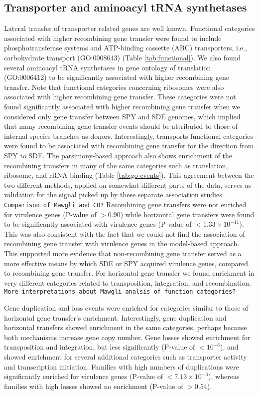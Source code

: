 \documentclass[english]{article}
\begin{document}
\subsection{Transporter and aminoacyl tRNA synthetases}
Lateral transfer of transporter related genes are well known.  Functional
categories associated with higher recombining gene transfer were found to
include phosphotransferase systems and ATP-binding cassette (ABC) transporters,
i.e., carbohydrate transport (GO:0008643) (Table \ref{tab:functional}).  We also
found several aminoacyl tRNA synthetases in gene ontology of translation
(GO:0006412) to be significantly associated with higher recombining gene
transfer.  Note that functional categories concerning ribosomes were also
associated with higher recombining gene transfer. These categories were not
found significantly associated with higher recombining gene transfer when we
considered only gene transfer between SPY and SDE genomes, which implied that
many recombining gene transfer events should be attributed to those of internal
species branches as donors.  Interestingly, transports functional categories
were found to be associated with recombining gene transfer for the direction
from SPY to SDE.  The parsimony-based approach also  shows enrichment of the
recombining transfers in many of the same categories such as translation,
ribosome, and rRNA binding (Table \ref{tab:go-events}).  This agreement between
the two different methods, applied on somewhat different parts of the data,
serves as validation for the signal picked up by these separate association
studies.  
\texttt{Comparison of Mawgli and CO?}
Recombining gene transfers were not enriched for virulence genes (P-value of
$>0.90$) while horizontal gene transfers were found to be significantly
associated with virulence genes (P-value of $<1.33 \times 10^{-11}$). This was
also consistent with the fact that we could not find the association of
recombining gene transfer with virulence genes in the model-based approach.
This supported more evidence that non-recombining gene transfer served as a more
effective means by which SDE or SPY acquired virulence genes, compared to
recombining gene transfer.  For horizontal gene transfer we found enrichment in
very different categories related to transposition, integration, and
recombination.  
\texttt{More interpretations about Mawgli analsis of function categories?}

Gene duplication and loss events were enriched for categories similar to those
of horizontal gene transfer's enrichment.  Interestingly, gene duplication and
horizontal transfers showed enrichment in the same categories, perhaps because
both mechanisms increase gene copy number.  Gene losses showed enrichment
for transposition and integration, but less significantly (P-value of
$<10^{-6}$), and showed enrichment for several additional categories such as
transporter activity and transcription initiation.  Families with high numbers
of duplications were significantly enriched for virulence genes (P-value of
$<7.13 \times 10^{-3}$), whereas families with high losses showed no enrichment
(P-value of $>0.54$). 
\end{document}
